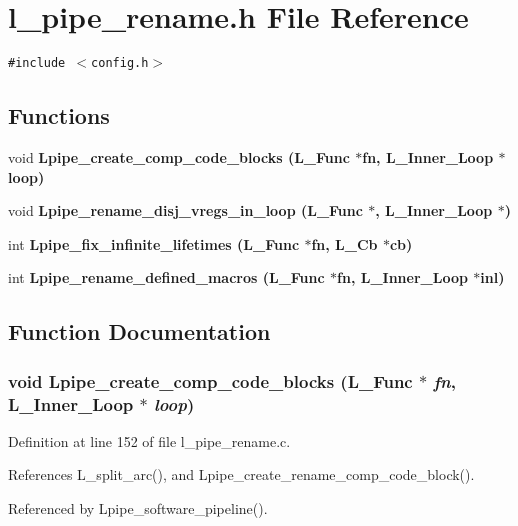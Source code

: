 \section{l\_\-pipe\_\-rename.h File Reference}
\label{l__pipe__rename_8h}
{\tt \#include $<$config.h$>$}\par
\subsection*{Functions}
\begin{CompactItemize}
\item 
void \bf{Lpipe\_\-create\_\-comp\_\-code\_\-blocks} (L\_\-Func $\ast$fn, L\_\-Inner\_\-Loop $\ast$loop)
\item 
void \bf{Lpipe\_\-rename\_\-disj\_\-vregs\_\-in\_\-loop} (L\_\-Func $\ast$, L\_\-Inner\_\-Loop $\ast$)
\item 
int \bf{Lpipe\_\-fix\_\-infinite\_\-lifetimes} (L\_\-Func $\ast$fn, L\_\-Cb $\ast$cb)
\item 
int \bf{Lpipe\_\-rename\_\-defined\_\-macros} (L\_\-Func $\ast$fn, L\_\-Inner\_\-Loop $\ast$inl)
\end{CompactItemize}


\subsection{Function Documentation}
\subsubsection{\setlength{\rightskip}{0pt plus 5cm}void Lpipe\_\-create\_\-comp\_\-code\_\-blocks (L\_\-Func $\ast$ {\em fn}, L\_\-Inner\_\-Loop $\ast$ {\em loop})}\label{l__pipe__rename_8h_fffde84a48fda4a4a865640c272c2220}




Definition at line 152 of file l\_\-pipe\_\-rename.c.

References L\_\-split\_\-arc(), and Lpipe\_\-create\_\-rename\_\-comp\_\-code\_\-block().

Referenced by Lpipe\_\-software\_\-pipeline().
